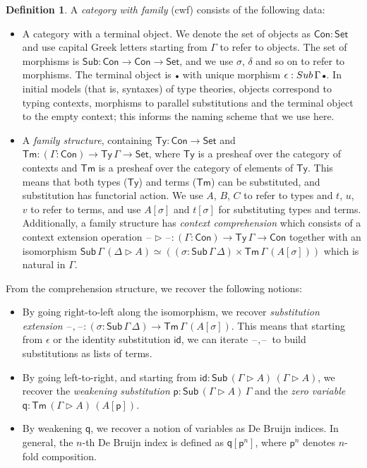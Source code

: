 \documentclass[a4paper,UKenglish,cleveref, autoref, thm-restate]{lipics-v2021}
\theoremstyle{remark}
\theoremstyle{definition}
\newtheorem{mydefinition}{Definition}
\newcommand{\Seti}{\mathsf{Set}}
\newcommand{\Con}{\mathsf{Con}}
\newcommand{\Ty}{\mathsf{Ty}}
\newcommand{\Tm}{\mathsf{Tm}}
\newcommand{\Sub}{\mathsf{Sub}}
\newcommand{\emptycon}{\scaleobj{.75}\bullet}
\newcommand{\id}{\mathsf{id}}
\newcommand{\ext}{\triangleright}
\newcommand{\blank}{\mathord{\hspace{1pt}\text{--}\hspace{1pt}}}
\newcommand{\p}{\mathsf{p}}
\newcommand{\q}{\mathsf{q}}
\begin{document}
\begin{mydefinition}
A \emph{category with family} (cwf) \cite{Dybjer96internaltype} consists of the following data:
\begin{itemize}
\item A category with a terminal object. We denote the set of objects as $\Con :
  \Seti$ and use capital Greek letters starting from $\Gamma$ to refer to
  objects. The set of morphisms is $\Sub : \Con \to \Con \to \Seti$, and we use
  $\sigma$, $\delta$ and so on to refer to morphisms. The terminal object is
  $\emptycon$ with unique morphism $\epsilon : \Sub\,\Gamma\,\emptycon$. In
  initial models (that is, syntaxes) of type theories, objects correspond to
  typing contexts, morphisms to parallel substitutions and the terminal object to
  the empty context; this informs the naming scheme that we use here.
\item A \emph{family structure}, containing $\Ty : \Con \to \Seti$ and $\Tm :
  (\Gamma : \Con) \to \Ty\,\Gamma \to \Seti$, where $\Ty$ is a presheaf over the
  category of contexts and $\Tm$ is a presheaf over the category of elements of
  $\Ty$. This means that both types ($\Ty$) and terms ($\Tm$) can be
  substituted, and substitution has functorial action. We use $A$, $B$, $C$ to
  refer to types and $t$, $u$, $v$ to refer to terms, and use $A[\sigma]$ and
  $t[\sigma]$ for substituting types and terms. Additionally, a family structure
  has \emph{context comprehension} which consists of a context extension
  operation $\blank\ext\blank : (\Gamma : \Con) \to \Ty\,\Gamma \to \Con$
  together with an isomorphism $\Sub\,\Gamma\,(\Delta\ext A) \simeq ((\sigma :
  \Sub\,\Gamma\,\Delta) \times \Tm\,\Gamma\,(A[\sigma]))$ which is natural in
  $\Gamma$.
\end{itemize}
\end{mydefinition}

\noindent From the comprehension structure, we recover the following notions:

\begin{itemize}
\item By going right-to-left along the isomorphism, we recover \emph{substitution extension}
      $\blank,\blank : (\sigma : \Sub\,\Gamma\,\Delta) \to \Tm\,\Gamma\,(A[\sigma])$. This means
      that starting from $\epsilon$ or the identity substitution $\id$, we can iterate $\blank,\blank$
      to build substitutions as lists of terms.
\item By going left-to-right, and starting from $\id : \Sub\,(\Gamma\ext A)\,(\Gamma\ext A)$, we recover
      the \emph{weakening substitution} $\p : \Sub\,(\Gamma\ext A)\,\Gamma$ and the \emph{zero variable}
      $\q : \Tm\,(\Gamma\ext A)\,(A[\p])$.
\item By weakening $\q$, we recover a notion of variables as De Bruijn indices. In general, the $n$-th
      De Bruijn index is defined as $\q[\p^{n}]$, where $\p^{n}$ denotes $n$-fold composition.
\end{itemize}
\end{document}

